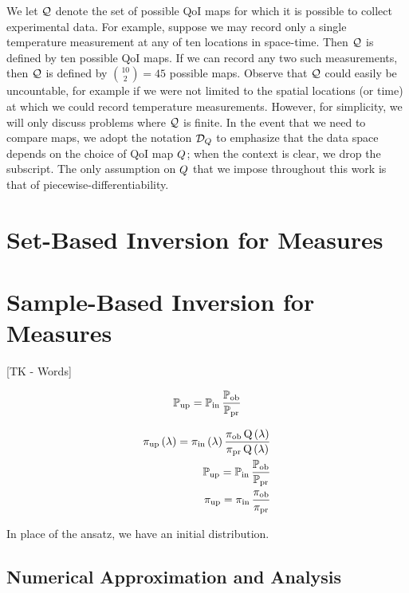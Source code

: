 We let $\mathcal{Q}$ denote the set of possible QoI maps for which it is possible to collect experimental data.
For example, suppose we may record only a single temperature measurement at any of ten locations in space-time.
Then $\mathcal{Q}$ is defined by ten possible QoI maps.
If we can record any two such measurements, then $\mathcal{Q}$ is defined by $\binom{10}{2} = 45$ possible maps.
Observe that $\mathcal{Q}$ could easily be uncountable, for example if we were not limited to the spatial locations (or time) at which we could record temperature measurements.
However, for simplicity, we will only discuss problems where $\mathcal{Q}$ is finite.
In the event that we need to compare maps, we adopt the notation $\mathcal{D}_{Q}$ to emphasize that the data space depends on the choice of QoI map $Q$; when the context is clear, we drop the subscript.
The only assumption on $Q$ that we impose throughout this work is that of piecewise-differentiability.


\section{Set-Based Inversion for Measures}\label{sec:ch02-set}




\pagebreak
\section{Sample-Based Inversion for Measures}\label{sec:ch02-sample}
[TK - Words]

\begin{equation}
\operatorname*{\mathbb{P}_{up}} = \operatorname*{\mathbb{P}_{in}} \frac{\operatorname*{\mathbb{P}_{ob}}}{\operatorname*{\mathbb{P}_{pr}}}
\end{equation}

\begin{equation}
\begin{split}
\operatorname*{\operatorname*{\pi_{up}}\left ( \lambda \right ) = \operatorname*{\pi_{in}}\left ( \lambda \right ) \frac{\operatorname*{\pi_{ob}}Q\left ( \lambda \right )}{\operatorname*{\pi_{pr}}Q\left ( \lambda \right )}}\\
\operatorname*{\operatorname*{\mathbb{P}_{up}} = \operatorname*{\mathbb{P}_{in}} \frac{\operatorname*{\mathbb{P}_{ob}}}{\operatorname*{\mathbb{P}_{pr}}}}\\
\operatorname*{\operatorname*{\pi_{up}} = \operatorname*{\pi_{in}} \frac{\operatorname*{\pi_{ob}}}{\operatorname*{\pi_{pr}}}}
\end{split}
\end{equation}

In place of the ansatz, we have an initial distribution.

\subsection{Numerical Approximation and Analysis}\label{sec:sample-approx}


